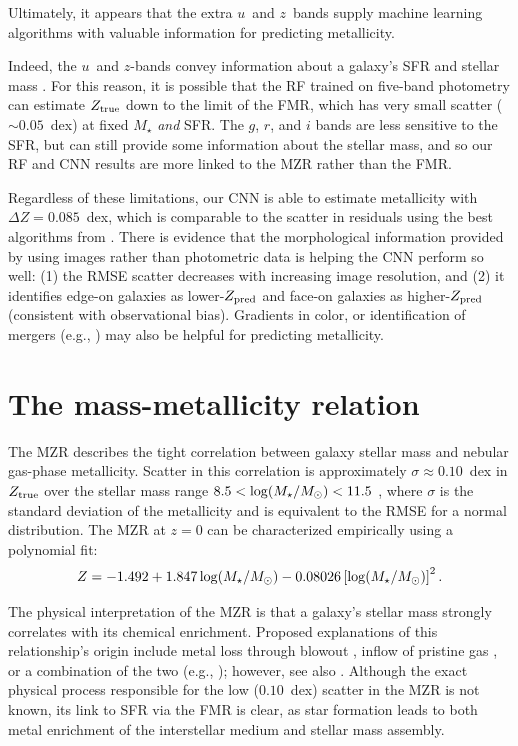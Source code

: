 \documentclass[fleqn,usenatbib]{mnras}
\newcommand{\sdssu}{\hbox{$u$}}
\newcommand{\sdssg}{\hbox{$g$}}
\newcommand{\sdssr}{\hbox{$r$}}
\newcommand{\sdssi}{\hbox{$i$}}
\newcommand{\sdssz}{\hbox{$z$}}
\newcommand{\mstar}{\hbox{$M_{\star}$}}
\newcommand{\msol}{\hbox{$M_\odot$}}
\newcommand{\eg}{e.g.}
\newcommand{\citeeg}[1]{(\eg, \citealt{#1})}
\begin{document}
Ultimately, it appears that the extra \sdssu\ and \sdssz\ bands supply machine learning algorithms with valuable information for predicting metallicity.

Indeed, the \sdssu\ and \sdssz-bands convey information about a galaxy's SFR and stellar mass \cite[see, e.g.,][]{Hopkins2003}. For this reason, it is possible that the RF trained on five-band photometry can estimate $Z_{\rm true}$ down to the limit of the FMR, which has very small scatter ($\sim 0.05$~dex) at fixed $M_{\star}$ \textit{and} SFR. The \sdssg{}, \sdssr{}, and \sdssi{} bands are less sensitive to the SFR, but can still provide some information about the stellar mass, and so our RF and CNN results are more linked to the MZR rather than the FMR.

Regardless of these limitations, our CNN is able to estimate metallicity with $\Delta Z = 0.085$~dex, which is comparable to the scatter in residuals using the best algorithms from \cite{Acquaviva2016}. There is evidence that the morphological information provided by using images rather than photometric data is helping the CNN perform so well: (1) the RMSE scatter decreases with increasing image resolution, and (2) it identifies edge-on galaxies as lower-$Z_{\rm pred}$ and face-on galaxies as higher-$Z_{\rm pred}$ (consistent with observational bias). Gradients in color, or identification of mergers \citeeg{Ackermann2018} may also be helpful for predicting metallicity.


\section{The mass-metallicity relation} \label{sec:MZR}
The MZR describes the tight correlation between galaxy stellar mass and nebular gas-phase metallicity. Scatter in this correlation is approximately $\sigma \approx 0.10$~dex in $Z_{\rm true}$ over the stellar mass range $8.5 < \log (\mstar / \msol) < 11.5$ \citep{Tremonti2004}, where $\sigma$ is the standard deviation of the metallicity and is equivalent to the RMSE for a normal distribution. The MZR at $z=0$ can be characterized empirically using a polynomial fit:
\begin{equation}\label{eq:mzr}
Z = -1.492 + 1.847 \log (\mstar / \msol) - 0.08026 \left [\log(\mstar / \msol)\right ]^2.
\end{equation}

The physical interpretation of the MZR is that a galaxy's stellar mass strongly correlates with its chemical enrichment. Proposed explanations of this relationship's origin include metal loss through blowout \citep[see, e.g.,][]{2002ApJ...581.1019G,Tremonti2004,Brooks2007,Dave2012}, inflow of pristine gas \cite{Dalcanton2004}, or a combination of the two \citeeg{2013ApJ...772..119L}; however, see also \cite{2013A&A...554A..58S}. Although the exact physical process responsible for the low ($0.10$~dex) scatter in the MZR is not known, its link to SFR via the FMR is clear, as star formation leads to both metal enrichment of the interstellar medium and stellar mass assembly.
\end{document}
